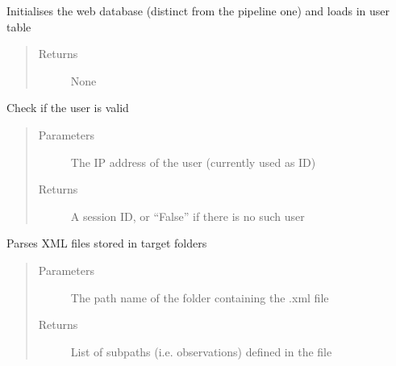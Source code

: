 \documentclass[letterpaper,10pt,english]{sphinxmanual}
\begin{document}
\begin{fulllineitems}
\label{\detokenize{funcs:backend.startBackend}}
Initialises the web database (distinct from the pipeline one) and
loads in user table
\begin{quote}\begin{description}
\item[{Returns}] \leavevmode
None

\end{description}\end{quote}

\end{fulllineitems}


\begin{fulllineitems}
\label{\detokenize{funcs:backend.usercheck}}
Check if the user is valid
\begin{quote}\begin{description}
\item[{Parameters}] \leavevmode
{} \textendash{} The IP address of the user (currently used as ID)

\item[{Returns}] \leavevmode
A session ID, or “False” if there is no such user

\end{description}\end{quote}

\end{fulllineitems}


\begin{fulllineitems}
\label{\detokenize{funcs:backend.xmlListing}}
Parses XML files stored in target folders
\begin{quote}\begin{description}
\item[{Parameters}] \leavevmode
{} \textendash{} The path name of the folder containing the .xml file

\item[{Returns}] \leavevmode
List of subpaths (i.e. observations) defined in the file

\end{description}\end{quote}

\end{fulllineitems}
\end{document}
